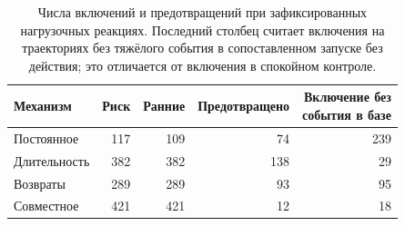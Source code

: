 \clearpage
\begin{table}[p]\caption{Числа включений и предотвращений при зафиксированных нагрузочных реакциях. Последний столбец считает включения на траекториях без тяжёлого события в сопоставленном запуске без действия; это отличается от включения в спокойном контроле.}\centering\small\setlength{\tabcolsep}{3pt}\begin{tabular}{lrrrr}\toprule
Механизм & Риск & Ранние & Предотвращено & \shortstack{Включение без\\события в базе}\\\midrule
Постоянное & 117 & 109 & 74 & 239\\
Длительность & 382 & 382 & 138 & 29\\
Возвраты & 289 & 289 & 93 & 95\\
Совместное & 421 & 421 & 12 & 18\\
\bottomrule\end{tabular}\end{table}\clearpage
